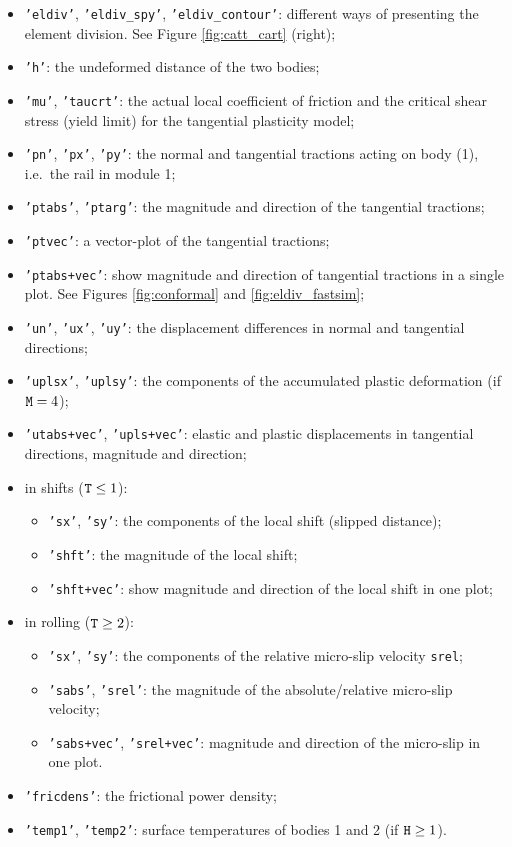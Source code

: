 \documentclass[12pt]{report}
\begin{document}
\begin{itemize}
\item {\tt 'eldiv'}, {\tt 'eldiv\_spy'}, {\tt 'eldiv\_contour'}: different
        ways of presenting the element division. See Figure
        \ref{fig:catt_cart} (right);
\item {\tt 'h'}: the undeformed distance of the two bodies;
\item {\tt 'mu'}, {\tt 'taucrt'}: the actual local coefficient of
        friction and the critical shear stress (yield limit) for the
        tangential plasticity model;
\item {\tt 'pn'}, {\tt 'px'}, {\tt 'py'}: the normal and tangential
        tractions acting on body (1), i.e.\ the rail in module 1;
\item {\tt 'ptabs'}, {\tt 'ptarg'}: the magnitude and direction of the
        tangential tractions;
\item {\tt 'ptvec'}: a vector-plot of the tangential tractions;
\item {\tt 'ptabs+vec'}: show magnitude and direction of tangential tractions
        in a single plot. See Figures \ref{fig:conformal} and
        \ref{fig:eldiv_fastsim};
\item {\tt 'un'}, {\tt 'ux'}, {\tt 'uy'}: the displacement differences in
        normal and tangential directions;
\item {\tt 'uplsx'}, {\tt 'uplsy'}: the components of the accumulated
        plastic deformation (if ${\tt M}=4$);
\item {\tt 'utabs+vec'}, {\tt 'upls+vec'}: elastic and plastic
        displacements in tangential directions, magnitude and direction;
\item in shifts (${\tt T}\le 1$): 
\begin{itemize}
\item {\tt 'sx'}, {\tt 'sy'}: the components of the local shift (slipped
        distance);
\item {\tt 'shft'}: the magnitude of the local shift;
\item {\tt 'shft+vec'}: show magnitude and direction of the local shift in
        one plot;
\end{itemize}
\item in rolling (${\tt T}\ge 2$):
\begin{itemize}
\item {\tt 'sx'}, {\tt 'sy'}: the components of the relative micro-slip
        velocity {\tt srel};
\item {\tt 'sabs'}, {\tt 'srel'}: the magnitude of the absolute/relative
        micro-slip velocity;
\item {\tt 'sabs+vec'}, {\tt 'srel+vec'}: magnitude and direction of
        the micro-slip in one plot.
\end{itemize}
\item {\tt 'fricdens'}: the frictional power density;
\item {\tt 'temp1'}, {\tt 'temp2'}: surface temperatures of bodies 1 and 2
        (if ${\tt H}\ge 1$).
\end{itemize}
\end{document}
